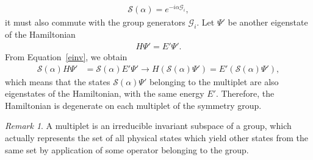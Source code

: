 \documentclass[12pt,a4paper]{report}
\theoremstyle{definition}
\theoremstyle{remark}
\newtheorem*{remark}{Remark}
\theoremstyle{remark}
\begin{document}
\begin{align*}
\mathcal{S}(\alpha)=e^{-i\alpha\mathcal{G}_i},
\end{align*}
it must also commute with the group generators $\mathcal{G}_i$. Let $\Psi'$ be another eigenstate of the Hamiltonian
\begin{align*}
H\Psi'=E'\Psi'.
\end{align*}
From Equation~\ref{einv}, we obtain
\begin{align*}
\mathcal{S}(\alpha)H\Psi'&=\mathcal{S}(\alpha)E'\Psi' \rightarrow H(\mathcal{S}(\alpha)\Psi')=E'(\mathcal{S}(\alpha)\Psi'),
\end{align*}
which means that the states $\mathcal{S}(\alpha)\Psi'$ belonging to the multiplet are also eigenstates of the Hamiltonian, with the same energy $E'$. Therefore, the Hamiltonian is degenerate on each multiplet of the symmetry group.
\begin{remark}
A multiplet is an irreducible invariant subspace of a group, which actually represents the set of all physical states which yield other states from the same set by application of some operator belonging to the group. 
\end{remark}
\end{document}
